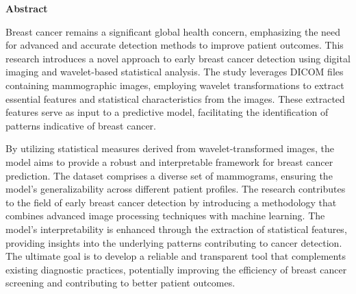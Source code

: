 \begin{center}
	\textbf{\large Abstract}
\end{center}
\noindent
Breast cancer remains a significant global health concern, emphasizing the need for advanced and accurate detection methods to improve patient outcomes. This research introduces a novel approach to early breast cancer detection using digital imaging and wavelet-based statistical analysis. The study leverages DICOM files containing mammographic images, employing wavelet transformations to extract essential features and statistical characteristics from the images. These extracted features serve as input to a predictive model, facilitating the identification of patterns indicative of breast cancer.

By utilizing statistical measures derived from wavelet-transformed images, the model aims to provide a robust and interpretable framework for breast cancer prediction. The dataset comprises a diverse set of mammograms, ensuring the model's generalizability across different patient profiles. The research contributes to the field of early breast cancer detection by introducing a methodology that combines advanced image processing techniques with machine learning. The model's interpretability is enhanced through the extraction of statistical features, providing insights into the underlying patterns contributing to cancer detection. The ultimate goal is to develop a reliable and transparent tool that complements existing diagnostic practices, potentially improving the efficiency of breast cancer screening and contributing to better patient outcomes. 